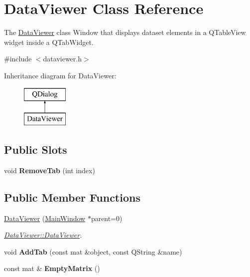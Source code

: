 \hypertarget{class_data_viewer}{}\section{Data\+Viewer Class Reference}
\label{class_data_viewer}


The \hyperlink{class_data_viewer}{Data\+Viewer} class Window that displays dataset elements in a Q\+Table\+View widget inside a Q\+Tab\+Widget.  




{\ttfamily \#include $<$dataviewer.\+h$>$}

Inheritance diagram for Data\+Viewer\+:\begin{figure}[H]
\begin{center}
\leavevmode
\includegraphics[height=2.000000cm]{class_data_viewer}
\end{center}
\end{figure}
\subsection*{Public Slots}
\begin{DoxyCompactItemize}
\item 
void {\bfseries Remove\+Tab} (int index)\hypertarget{class_data_viewer_a1fc3adf11c33af30e2592277566029a7}{}\label{class_data_viewer_a1fc3adf11c33af30e2592277566029a7}

\end{DoxyCompactItemize}
\subsection*{Public Member Functions}
\begin{DoxyCompactItemize}
\item 
\hyperlink{class_data_viewer_a01e88d2b8a54711550dd5ee10eda415c}{Data\+Viewer} (\hyperlink{class_main_window}{Main\+Window} $\ast$parent=0)
\begin{DoxyCompactList}\small\item\em \hyperlink{class_data_viewer_a01e88d2b8a54711550dd5ee10eda415c}{Data\+Viewer\+::\+Data\+Viewer}. \end{DoxyCompactList}\item 
void {\bfseries Add\+Tab} (const mat \&object, const Q\+String \&name)\hypertarget{class_data_viewer_a10dcaec63874d3ffa5ac2fee93ef3142}{}\label{class_data_viewer_a10dcaec63874d3ffa5ac2fee93ef3142}

\item 
const mat \& {\bfseries Empty\+Matrix} ()\hypertarget{class_data_viewer_ac0924576701ca847da0caeddabe4e4b0}{}\label{class_data_viewer_ac0924576701ca847da0caeddabe4e4b0}

\end{DoxyCompactItemize}


